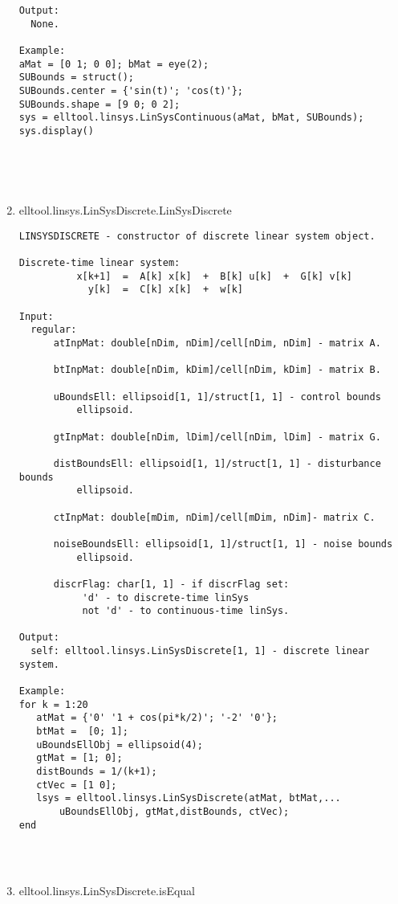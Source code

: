 \begin{enumerate}
\begin{lstlisting}
Output:
  None.

Example:
aMat = [0 1; 0 0]; bMat = eye(2);
SUBounds = struct();
SUBounds.center = {'sin(t)'; 'cos(t)'};
SUBounds.shape = [9 0; 0 2];
sys = elltool.linsys.LinSysContinuous(aMat, bMat, SUBounds);
sys.display()





\end{lstlisting}
\fontfamily{\familydefault}
\selectfont
\item {elltool.linsys.LinSysDiscrete.LinSysDiscrete}
\selectfont
\begin{lstlisting}
LINSYSDISCRETE - constructor of discrete linear system object.

Discrete-time linear system:
          x[k+1]  =  A[k] x[k]  +  B[k] u[k]  +  G[k] v[k]
            y[k]  =  C[k] x[k]  +  w[k]

Input:
  regular:
      atInpMat: double[nDim, nDim]/cell[nDim, nDim] - matrix A.

      btInpMat: double[nDim, kDim]/cell[nDim, kDim] - matrix B.

      uBoundsEll: ellipsoid[1, 1]/struct[1, 1] - control bounds
          ellipsoid.

      gtInpMat: double[nDim, lDim]/cell[nDim, lDim] - matrix G.

      distBoundsEll: ellipsoid[1, 1]/struct[1, 1] - disturbance bounds
          ellipsoid.

      ctInpMat: double[mDim, nDim]/cell[mDim, nDim]- matrix C.

      noiseBoundsEll: ellipsoid[1, 1]/struct[1, 1] - noise bounds
          ellipsoid.

      discrFlag: char[1, 1] - if discrFlag set:
           'd' - to discrete-time linSys
           not 'd' - to continuous-time linSys.

Output:
  self: elltool.linsys.LinSysDiscrete[1, 1] - discrete linear system.

Example:
for k = 1:20
   atMat = {'0' '1 + cos(pi*k/2)'; '-2' '0'};
   btMat =  [0; 1];
   uBoundsEllObj = ellipsoid(4);
   gtMat = [1; 0];
   distBounds = 1/(k+1);
   ctVec = [1 0];
   lsys = elltool.linsys.LinSysDiscrete(atMat, btMat,...
       uBoundsEllObj, gtMat,distBounds, ctVec);
end




\end{lstlisting}
\fontfamily{\familydefault}
\selectfont
\item {elltool.linsys.LinSysDiscrete.isEqual}
\selectfont
\begin{lstlisting}


\end{lstlisting}
\end{enumerate}
